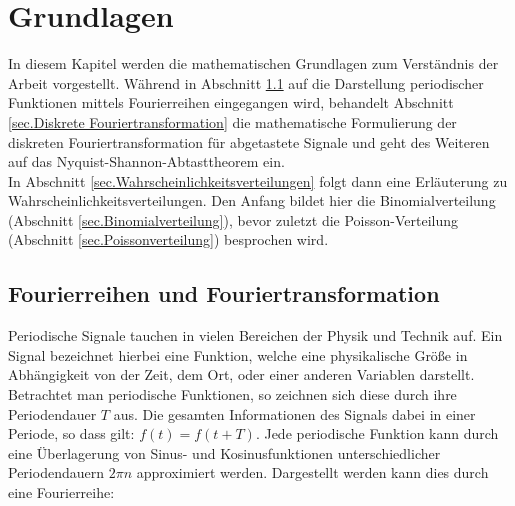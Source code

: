 \chapter{Grundlagen}
In diesem Kapitel werden die mathematischen Grundlagen zum Verständnis der Arbeit vorgestellt. Während in Abschnitt \ref{sec:Fourierreihen und Fouriertransformation} auf die Darstellung periodischer Funktionen mittels Fourierreihen eingegangen wird, behandelt Abschnitt \ref{sec.Diskrete Fouriertransformation} die mathematische Formulierung der diskreten Fouriertransformation für abgetastete Signale und geht des Weiteren auf das Nyquist-Shannon-Abtasttheorem ein.\\
In Abschnitt \ref{sec.Wahrscheinlichkeitsverteilungen} folgt dann eine Erläuterung zu Wahrscheinlichkeitsverteilungen. Den Anfang bildet hier die Binomialverteilung (Abschnitt \ref{sec.Binomialverteilung}), bevor zuletzt die Poisson-Verteilung (Abschnitt \ref{sec.Poissonverteilung}) besprochen wird.

\section{Fourierreihen und Fouriertransformation}
\label{sec:Fourierreihen und Fouriertransformation}
Periodische Signale tauchen in vielen Bereichen der Physik und Technik auf. Ein Signal bezeichnet hierbei eine Funktion, welche eine physikalische Größe in Abhängigkeit von der Zeit, dem Ort, oder einer anderen Variablen darstellt. Betrachtet man periodische Funktionen, so zeichnen sich diese durch ihre Periodendauer $T$ aus. Die gesamten Informationen des Signals dabei in einer Periode, so dass gilt: $f(t) = f(t+T)$. Jede periodische Funktion kann durch eine Überlagerung von Sinus- und Kosinusfunktionen unterschiedlicher Periodendauern $2 \pi n$ approximiert werden. Dargestellt werden kann dies durch eine Fourierreihe: 

